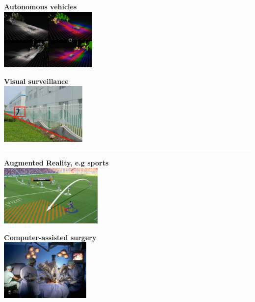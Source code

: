 \documentclass[a4paper, fontsize=8pt, landscape, DIV=1]{scrartcl}
\begin{document}
\begin{multicols*}{4}
\begin{minipage}[t]{0.49\columnwidth}
			\begin{flushleft}
				{\centering \textbf{Autonomous vehicles}\\}
				\includegraphics[width=\columnwidth, height=3cm]{images/Introduction/app_autonomous_vehicles.png} 
			\end{flushleft}
		\end{minipage}
		\begin{minipage}[t]{0.49\columnwidth}
			\begin{flushright}
				{\centering \textbf{Visual surveillance}\\}
				\includegraphics[width=\columnwidth, height=3cm]{images/Introduction/app_surveillance.png}
			\end{flushright}
		\end{minipage}
		\hrule
		\begin{minipage}[t]{0.49\columnwidth}
			\begin{flushleft}
				{\centering \textbf{Augmented Reality, e.g sports}\\}
				\includegraphics[width=\columnwidth, height=3cm]{images/Introduction/app_augm_reality.png} 
			\end{flushleft}
		\end{minipage}
		\begin{minipage}[t]{0.49\columnwidth}
			\begin{flushright}
				{\centering \textbf{Computer-assisted surgery}\\}
				\includegraphics[width=\columnwidth, height=3cm]{images/Introduction/app_surgery.png}

\end{flushright}
\end{minipage}
\end{multicols*}
\end{document}
